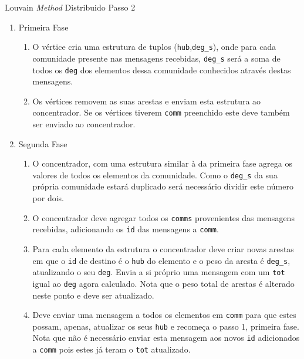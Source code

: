 \documentclass[a4paper,10pt]{report}
\begin{document}
\begin{algorithm}[H]
\caption{Louvain \textit{Method} Distribuido Passo 2}
\label{alg:lmdPasso2}
\begin{enumerate}
	\item Primeira Fase
	
	\begin{enumerate}
		\item O vértice cria uma estrutura de tuplos (\verb|hub|,\verb|deg_s|), onde para cada comunidade presente nas mensagens recebidas, \verb|deg_s| será a soma de todos os \verb|deg| dos elementos dessa comunidade conhecidos através destas mensagens.
		\item Os vértices removem as suas arestas e enviam esta estrutura ao concentrador. Se os vértices tiverem \verb|comm| preenchido este deve também ser enviado ao concentrador.
	\end{enumerate}
	
	\item Segunda Fase
	
	
	\begin{enumerate}
		\item O concentrador, com uma estrutura similar à da primeira fase agrega os valores de todos os elementos da comunidade. Como o \verb|deg_s| da sua própria comunidade estará duplicado será necessário dividir este número por dois.
		\item O concentrador deve agregar todos os \verb|comms| provenientes das mensagens recebidas, adicionando os \verb|id| das mensagens a \verb|comm|.
		\item Para cada elemento da estrutura o concentrador deve criar novas arestas em que o \verb|id| de destino é o \verb|hub| do elemento e o peso da aresta é \verb|deg_s|, atualizando o seu \verb|deg|. Envia a si próprio uma mensagem com um \verb|tot| igual ao \verb|deg| agora calculado. Nota que o peso total de arestas é alterado neste ponto e deve ser atualizado.
		\item Deve enviar uma mensagem a todos os elementos em \verb|comm| para que estes possam, apenas, atualizar os seus \verb|hub| e recomeça o passo 1, primeira fase. Nota que não é necessário enviar esta mensagem aos novos \verb|id| adicionados a \verb|comm| pois estes já teram o \verb|tot| atualizado.
	\end{enumerate}
\end{enumerate}
\end{algorithm}
\end{document}
